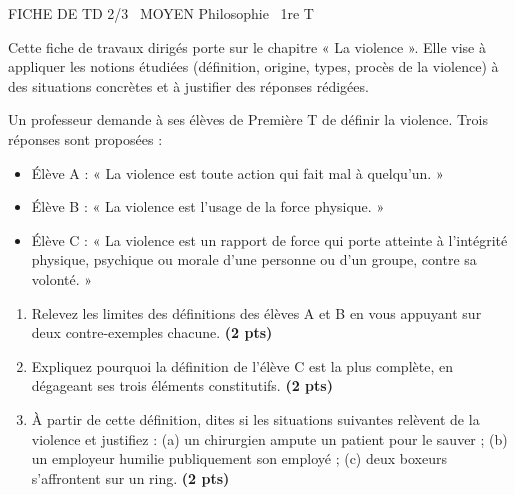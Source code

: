 \documentclass[11pt]{article}
\begin{document}
\begin{tcolorbox}[enhanced,colback=popink,colframe=popink,arc=10pt,boxrule=0pt,left=12pt,right=12pt,top=9pt,bottom=9pt]
{\color{white}\popxbold\small FICHE DE TD 2/3 \textbullet\ MOYEN \hfill Philosophie \textbullet\ 1re T\par}
\end{tcolorbox}
\vspace{4pt}
Cette fiche de travaux dirigés porte sur le chapitre « La violence ». Elle vise à appliquer les notions étudiées (définition, origine, types, procès de la violence) à des situations concrètes et à justifier des réponses rédigées.

\begin{exercice}
Un professeur demande à ses élèves de Première T de définir la violence. Trois réponses sont proposées :
\begin{itemize}
\item Élève A : « La violence est toute action qui fait mal à quelqu'un. »
\item Élève B : « La violence est l'usage de la force physique. »
\item Élève C : « La violence est un rapport de force qui porte atteinte à l'intégrité physique, psychique ou morale d'une personne ou d'un groupe, contre sa volonté. »
\end{itemize}
\begin{enumerate}
\item Relevez les limites des définitions des élèves A et B en vous appuyant sur deux contre-exemples chacune. \textbf{(2 pts)}
\item Expliquez pourquoi la définition de l'élève C est la plus complète, en dégageant ses trois éléments constitutifs. \textbf{(2 pts)}
\item À partir de cette définition, dites si les situations suivantes relèvent de la violence et justifiez : (a) un chirurgien ampute un patient pour le sauver ; (b) un employeur humilie publiquement son employé ; (c) deux boxeurs s'affrontent sur un ring. \textbf{(2 pts)}
\end{enumerate}
\end{exercice}
\end{document}
